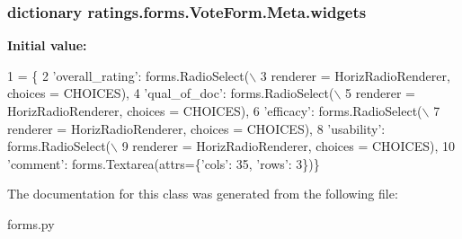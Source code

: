 \hypertarget{classratings_1_1forms_1_1VoteForm_1_1Meta_a06f1bcb74e8d8c3661382ca14eddfcf1}{
\subsubsection[{widgets}]{\setlength{\rightskip}{0pt plus 5cm}dictionary ratings.\-forms.\-Vote\-Form.\-Meta.\-widgets\hspace{0.3cm}{\ttfamily [static]}}}\label{classratings_1_1forms_1_1VoteForm_1_1Meta_a06f1bcb74e8d8c3661382ca14eddfcf1}
{\bfseries Initial value\-:}
\begin{DoxyCode}
1 = \{
2             \textcolor{stringliteral}{'overall\_rating'}: forms.RadioSelect(\(\backslash\)
3                 renderer = HorizRadioRenderer, choices = CHOICES), 
4             \textcolor{stringliteral}{'qual\_of\_doc'}: forms.RadioSelect(\(\backslash\)
5                 renderer = HorizRadioRenderer, choices = CHOICES), 
6             \textcolor{stringliteral}{'efficacy'}: forms.RadioSelect(\(\backslash\)
7                 renderer = HorizRadioRenderer, choices = CHOICES), 
8             \textcolor{stringliteral}{'usability'}: forms.RadioSelect(\(\backslash\)
9                 renderer = HorizRadioRenderer, choices = CHOICES),
10             \textcolor{stringliteral}{'comment'}: forms.Textarea(attrs=\{\textcolor{stringliteral}{'cols'}: 35, \textcolor{stringliteral}{'rows'}: 3\})\}
\end{DoxyCode}


The documentation for this class was generated from the following file\-:\begin{DoxyCompactItemize}
\item 
forms.\-py\end{DoxyCompactItemize}

